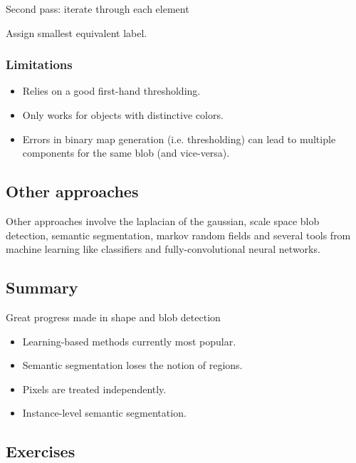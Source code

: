 Second pass: iterate through each element

Assign smallest equivalent label.
 
\subsubsection{Limitations}

\begin{itemize}
\item Relies on a good first-hand thresholding.
\item Only works for objects with distinctive colors.
\item Errors in binary map generation (i.e. thresholding) can lead to multiple components for the same blob (and vice-versa).
\end{itemize}

\subsection{Other approaches}

Other approaches involve the laplacian of the gaussian, scale space blob detection, semantic segmentation, markov random fields and several tools from machine learning like classifiers and fully-convolutional neural networks.

\subsection{Summary}

Great progress made in shape and blob detection

\begin{itemize}
\item Learning-based methods currently most popular.
\item Semantic segmentation loses the notion of regions.
\item Pixels are treated independently.
\item Instance-level semantic segmentation.
\end{itemize}

\subsection{Exercises}

\begin{figure}[H]
\centering
{}
\end{figure}

